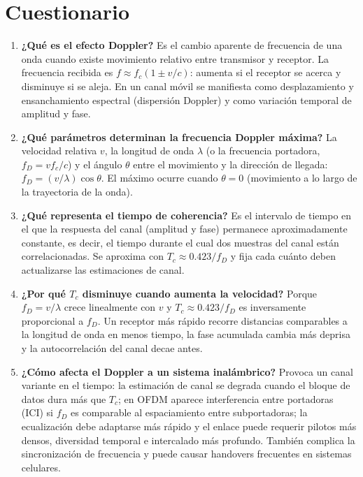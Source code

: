 \documentclass[11pt,a4paper]{article}
\begin{document}
\section{Cuestionario}

\begin{enumerate}
  \item \textbf{¿Qué es el efecto Doppler?} Es el cambio aparente de frecuencia de una onda cuando existe movimiento relativo entre transmisor y receptor. La frecuencia recibida es $f \approx f_c(1 \pm v/c)$: aumenta si el receptor se acerca y disminuye si se aleja. En un canal móvil se manifiesta como desplazamiento y ensanchamiento espectral (dispersión Doppler) y como variación temporal de amplitud y fase.
  \item \textbf{¿Qué parámetros determinan la frecuencia Doppler máxima?} La velocidad relativa $v$, la longitud de onda $\lambda$ (o la frecuencia portadora, $f_D = v f_c/c$) y el ángulo $\theta$ entre el movimiento y la dirección de llegada: $f_D = (v/\lambda)\cos\theta$. El máximo ocurre cuando $\theta = 0$ (movimiento a lo largo de la trayectoria de la onda).
  \item \textbf{¿Qué representa el tiempo de coherencia?} Es el intervalo de tiempo en el que la respuesta del canal (amplitud y fase) permanece aproximadamente constante, es decir, el tiempo durante el cual dos muestras del canal están correlacionadas. Se aproxima con $T_c \approx 0.423/f_D$ y fija cada cuánto deben actualizarse las estimaciones de canal.
  \item \textbf{¿Por qué $T_c$ disminuye cuando aumenta la velocidad?} Porque $f_D = v/\lambda$ crece linealmente con $v$ y $T_c \approx 0.423/f_D$ es inversamente proporcional a $f_D$. Un receptor más rápido recorre distancias comparables a la longitud de onda en menos tiempo, la fase acumulada cambia más deprisa y la autocorrelación del canal decae antes.
  \item \textbf{¿Cómo afecta el Doppler a un sistema inalámbrico?} Provoca un canal variante en el tiempo: la estimación de canal se degrada cuando el bloque de datos dura más que $T_c$; en OFDM aparece interferencia entre portadoras (ICI) si $f_D$ es comparable al espaciamiento entre subportadoras; la ecualización debe adaptarse más rápido y el enlace puede requerir pilotos más densos, diversidad temporal e intercalado más profundo. También complica la sincronización de frecuencia y puede causar handovers frecuentes en sistemas celulares.
\end{enumerate}
\end{document}
